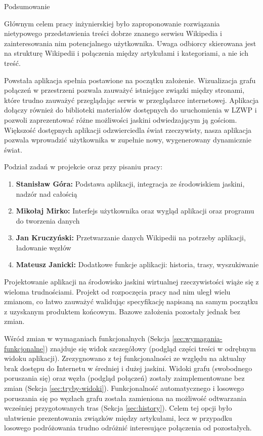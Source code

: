 \begin{chapter}{Podsumowanie}
	\newcommand{\chapterPath}{rozdzialy/7_podsumowanie}
	\label{ch:podsumowanie}
	
	Głównym celem pracy inżynierskiej było zaproponowanie rozwiązania nietypowego przedstawienia treści dobrze znanego serwisu Wikipedia i zainteresowania nim potencjalnego użytkownika. Uwaga odbiorcy skierowana jest na strukturę Wikipedii i połączenia między artykułami i kategoriami, a nie ich treść.

	Powstała aplikacja spełnia postawione na początku założenie. Wizualizacja grafu połączeń w przestrzeni pozwala zauważyć istniejące związki między stronami, które trudno zauważyć przeglądając serwis w przeglądarce internetowej. Aplikacja dołączy również do biblioteki materiałów dostępnych do uruchomienia w LZWP i pozwoli zaprezentować różne możliwości jaskini odwiedzającym ją gościom. Większość dostępnych aplikacji odzwierciedla świat rzeczywisty, nasza aplikacja pozwala wprowadzić użytkownika w zupełnie nowy, wygenerowany dynamicznie świat.

	Podział zadań w projekcie oraz przy pisaniu pracy:
	\begin{enumerate}[label=\textbullet]
		\item \textbf{Stanisław Góra:} \newline Podstawa aplikacji, integracja ze środowiskiem jaskini, nadzór nad całością
		\item \textbf{Mikołaj Mirko:} \newline Interfejs użytkownika oraz wygląd aplikacji oraz programu do tworzenia danych
		\item \textbf{Jan Kruczyński:} \newline Przetwarzanie danych Wikipedii na potrzeby aplikacji, ładowanie węzłów
		\item \textbf{Mateusz Janicki:} \newline Dodatkowe funkcje aplikacji: historia, trasy, wyszukiwanie
	\end{enumerate}
	
	Projektowanie aplikacji na środowisko jaskini wirtualnej rzeczywistości wiąże się z wieloma trudnościami. Projekt od rozpoczęcia pracy nad nim uległ wielu zmianom, co łatwo zauważyć walidując specyfikację napisaną na samym początku z uzyskanym produktem końcowym. Bazowe założenia pozostały jednak bez zmian.

	Wśród zmian w wymaganiach funkcjonalnych (Sekcja \ref{sec:wymagania-funkcjonalne}) znajduje się widok szczegółowy (podgląd części treści w odrębnym widoku aplikacji). Zrezygnowano z tej funkcjonalności ze względu na aktualny brak dostępu do Internetu w średniej i dużej jaskini. Widoki grafu (swobodnego poruszania się) oraz węzła (podgląd połączeń) zostały zaimplementowane bez zmian (Sekcja \ref{sec:tryby-widoki}). Funkcjonalność automatycznego i losowego poruszania się po węzłach grafu została zamieniona na możliwość odtwarzania wcześniej przygotowanych tras (Sekcja \ref{sec:history}). Celem tej opcji było ułatwienie prezentowania związków między artykułami, lecz w przypadku losowego podróżowania trudno odróżnić interesujące połączenia od pozostałych.


\end{chapter}
